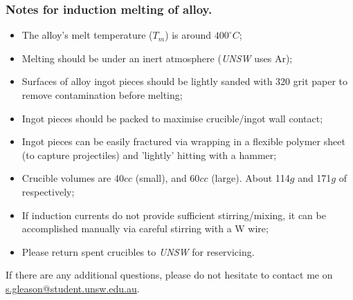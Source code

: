 \subsubsection{Notes for induction melting of \MgZnCa alloy.}
\begin{itemize}
\item The \MgZnCa alloy's melt temperature ($T_{m}$) is around $400^{\circ}C$;
\item Melting should be under an inert atmosphere (\textit{UNSW} uses Ar);
\item Surfaces of alloy ingot pieces should be lightly sanded with 320 grit paper to remove contamination before melting;
\item Ingot pieces should be packed to maximise crucible/ingot wall contact;
\item Ingot pieces can be easily fractured via wrapping in a flexible polymer sheet (to capture projectiles) and 'lightly' hitting with a hammer;
\item Crucible volumes are 40$cc$ (small), and 60$cc$ (large). About 114$g$ and 171$g$ of \MgZnCa respectively;
\item If induction currents do not provide sufficient stirring/mixing, it can be accomplished manually via careful stirring with a W wire; 
\item Please return spent crucibles to \textit{UNSW} for reservicing. 
\end{itemize}

If there are any additional questions, please do not hesitate to contact me on \href{mail:s.gleason@student.unsw.edu.au}{s.gleason@student.unsw.edu.au}. 